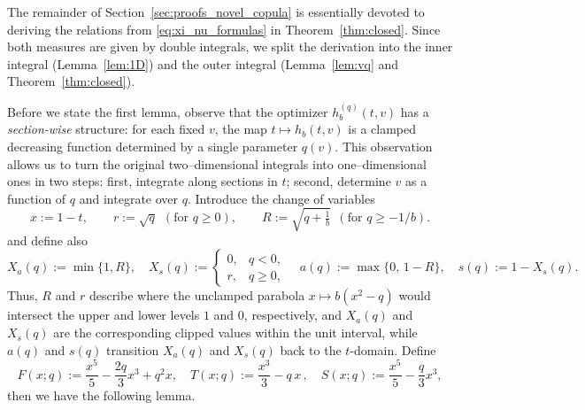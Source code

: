 \documentclass{article}
\newcommand{\1}{\mathds{1}}
\begin{document}
The remainder of Section~\ref{sec:proofs_novel_copula} is essentially devoted to deriving the relations from \eqref{eq:xi_nu_formulas} in Theorem~\ref{thm:closed}.
Since both measures are given by double integrals, we split the derivation into the inner integral (Lemma~\ref{lem:1D}) and the outer integral (Lemma~\ref{lem:vq} and Theorem~\ref{thm:closed}).

Before we state the first lemma, observe that the optimizer $h_b^{(q)}(t,v)$ has a \emph{section-wise} structure: for each fixed $v$, the map $t\mapsto h_b(t,v)$ is a clamped decreasing function determined by a single parameter $q(v)$.
This observation allows us to turn the original two–dimensional integrals into one–dimensional ones in two steps: first, integrate along sections in \(t\); second, determine $v$ as a function of $q$ and integrate over $q$.
Introduce the change of variables
\begin{equation}\label{eq:unclamped_switches}
x := 1 - t, \qquad 
r := \sqrt{q} \ \ (\text{for }q \ge 0), \qquad 
R := \sqrt{q + \tfrac{1}{b}} \ \ (\text{for }q \ge -1/b).
\end{equation}
and define also
\begin{equation}\label{eq:section_switches}
X_a(q) := \min\{1, R\}, \quad
X_s(q) :=
\begin{cases}
0, & q < 0,\\
r, & q \ge 0,
\end{cases}
\quad
a(q) := \max\{0,\, 1 - R\}, \quad
s(q) := 1 - X_s(q).
\end{equation}
Thus, \(R\) and \(r\) describe where the unclamped parabola \(x \mapsto b(x^2 - q)\) would intersect the upper and lower levels $1$ and $0$, respectively, and \(X_a(q)\) and \(X_s(q)\) are the corresponding clipped values within the unit interval, while \(a(q)\) and \(s(q)\) transition $X_a(q)$ and $X_s(q)$ back to the \(t\)-domain.
Define
\begin{equation}\label{eq:primitives}
F(x;q):=\frac{x^5}{5}-\frac{2q}{3}x^3+q^2x,\quad
T(x;q):=\frac{x^3}{3}-q\,x\,,\quad
S(x;q):=\frac{x^5}{5}-\frac{q}{3}x^3,
\end{equation}
then we have the following lemma.
\end{document}
